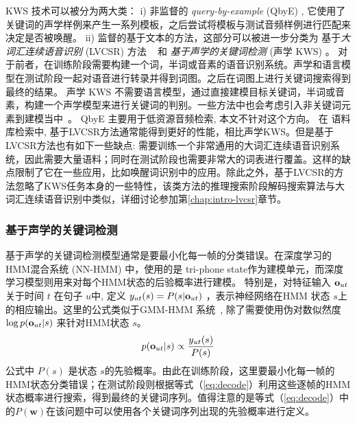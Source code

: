 KWS 技术可以被分为两大类：
i) 非监督的  {\em query-by-example} (QbyE) \cite{zhang2009unsupervised,barakat2012improved,chen2015query}, 它使用了关键词的声学样例来产生一系列模板，之后尝试将模板与测试音频样例进行匹配来决定是否被唤醒。
ii) 监督的基于文本的方法，这部分可以被进一步分类为  基于{\em 大词汇连续语音识别} (LVCSR)  方法 ~\cite{garofolo2000trec,ng2000subword} 和  {\em 基于声学的关键词检测} (声学 KWS) \cite{mandal2014recent}。
对于前者，在训练阶段需要构建一个词，半词或音素的语音识别系统。声学和语言模型在测试阶段一起对语音进行转录并得到词图。之后在词图上进行关键词搜索得到最终的结果。
声学 KWS 不需要语言模型，通过直接建模目标关键词，半词或音素，构建一个声学模型来进行关键词的判别。一些方法中也会考虑引入非关键词元素到建模当中~\cite{sukkar1996utterance}。
QbyE 主要用于低资源音频检索, 本文不针对这个方向。 
在 语料库检索中, 基于LVCSR方法通常能得到更好的性能，相比声学KWS。但是基于LVCSR方法也有如下一些缺点: 需要训练一个非常通用的大词汇连续语音识别系统，因此需要大量语料；同时在测试阶段也需要非常大的词表进行覆盖。这样的缺点限制了它在一些应用，比如唤醒词识别中的应用。除此之外，基于LVCSR的方法忽略了KWS任务本身的一些特性，该类方法的推理搜索阶段解码搜索算法与大词汇连续语音识别中类似，详细讨论参加第\ref{chap:intro-lvcsr}章节。


\subsubsection{基于声学的关键词检测}
\label{Sec:kws-and-disc}

基于声学的关键词检测模型通常是要最小化每一帧的分类错误。在深度学习的HMM混合系统 (NN-HMM) 中，使用的是 tri-phone state作为建模单元，而深度学习模型则用来对每个HMM状态的后验概率进行建模。
特别是，对特征输入 ${\bf o}_{ut}$ 关于时间 $t$ 在句子 $u$中, 定义 $y_{ut}(s)=P(s|{\bf o}_{ut})$ ，表示神经网络在HMM 状态 $s$上的相应输出。这里的公式类似于GMM-HMM 系统~\cite{young1994state}, 除了需要使用伪对数似然度 $\log p({\bf o}_{ut}|s)$ 来针对HMM状态 $s$。
\begin{equation}
\label{equ:dnn-hmm-define}
\begin{split}
 p({\bf o}_{ut}|s) \propto \frac{ y_{ut}(s)}{ P(s)}
\end{split}
\end{equation}
公式中 $P(s)$ 是状态 $s$的先验概率。由此在训练阶段，这里要最小化每一帧的HMM状态分类错误；在测试阶段则根据等式（\ref{eq:decode}）利用这些逐帧的HMM状态概率进行搜索，得到最终的关键词序列。值得注意的是等式（\ref{eq:decode}）中的$P(\mathbf{w})$在该问题中可以使用各个关键词序列出现的先验概率进行定义。

